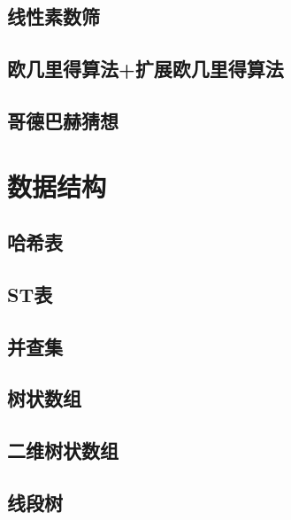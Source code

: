 \documentclass[twocolumn,a4]{article}  %
\begin{document}
	 	\subsection{线性素数筛}
	 	 	

	 	\subsection{欧几里得算法+扩展欧几里得算法}
	 	 	
	
	 	\subsection{哥德巴赫猜想}
	 	 	
	
	\section{数据结构}
		\subsection{哈希表}
			
			
		\subsection{ST表}
	 	 	
	 	 	
	 	\subsection{并查集}
	 	 	

	 	\subsection{树状数组}
	 	 	
	 	 	
	 	\subsection{二维树状数组}
	 	 	
	 	 	
	 	\subsection{线段树}
	 	 	
	 	 	
\end{document}
